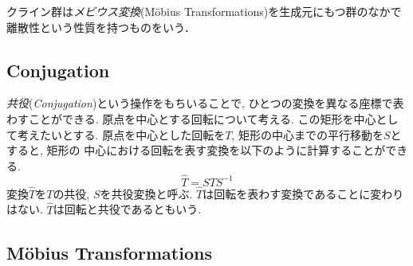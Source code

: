 クライン群は\emph{メビウス変換}(M\"obius Transformations)を生成元にもつ群のなかで離散性という性質を持つものをいう．

\subsection{Conjugation}

\emph{共役}(\textit{Conjugation})という操作をもちいることで, ひとつの変換を異なる座標で表わすことができる.
原点を中心とする回転について考える.
この矩形を中心として考えたいとする.
原点を中心とした回転を$T$, 矩形の中心までの平行移動を$S$とすると, 矩形の
中心における回転を表す変換を以下のように計算することができる.
\begin{equation*}
 \hat{T} = STS^{-1}
\end{equation*}
変換$\hat{T}$を$T$の共役, $S$を共役変換と呼ぶ.
$\hat{T}$は回転を表わす変換であることに変わりはない.
$\hat{T}$は回転と共役であるともいう.

\subsection{M\"obius Transformations}

